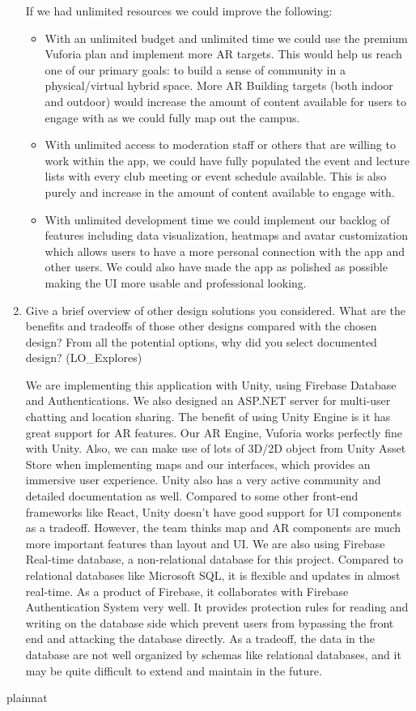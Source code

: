 \documentclass[12pt, titlepage]{article}
\begin{document}
\begin{enumerate}
  If we had unlimited resources we could improve the following:
  \begin{itemize}
  \item With an unlimited budget and unlimited time we could use the premium Vuforia plan and implement more AR targets. This would help us reach one of our primary goals: to build a sense of community in a physical/virtual hybrid space. More AR Building targets (both indoor and outdoor) would increase the amount of content available for users to engage with as we could fully map out the campus.
  \item With unlimited access to moderation staff or others that are willing to work within the app, we could have fully populated the event and lecture lists with every club meeting or event schedule available. This is also purely and increase in the amount of content available to engage with.
  \item With unlimited development time we could implement our backlog of features including data visualization, heatmaps and avatar customization which allows users to have a more personal connection with the app and other users. We could also have made the app as polished as possible making the UI more usable and professional looking.
  \end{itemize}
  
  
  \item Give a brief overview of other design solutions you considered.  What
  are the benefits and tradeoffs of those other designs compared with the chosen
  design?  From all the potential options, why did you select documented design?
  (LO\_Explores)
  
  We are implementing this application with Unity, using Firebase Database and Authentications. We also designed an ASP.NET server for multi-user chatting and location sharing.
  The benefit of using Unity Engine is it has great support for AR features. Our AR Engine, Vuforia works perfectly fine with Unity.  Also, we can make use of lots of 3D/2D object from Unity Asset Store when implementing maps and our interfaces, which provides an immersive user experience.  Unity also has a very active community and detailed documentation as well.  Compared to some other front-end frameworks like React, Unity doesn't have good support for UI components as a tradeoff. However, the team thinks map and AR components are much more important features than layout and UI.
  	We are also using Firebase Real-time database, a non-relational database for this project. Compared to relational databases like Microsoft SQL,  it is flexible and updates in almost real-time. As a product of Firebase, it collaborates with Firebase Authentication System very well. It provides protection rules for reading and writing on the database side which prevent users from bypassing the front end and attacking the database directly. As a tradeoff, the data in the database are not well organized by schemas like relational databases, and it may be quite difficult to extend and maintain in the future.
\end{enumerate}

\newpage
 {plainnat}


\newpage{}
\end{document}
